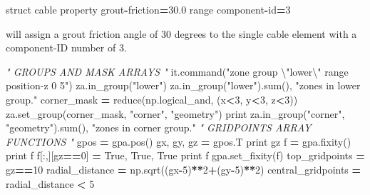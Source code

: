 \documentclass[a4paper, nobind]{templates/ociamthesis}
\newenvironment{Shaded}{\begin{snugshade}}{\end{snugshade}}
\newcommand{\BuiltInTok}[1]{#1}
\newcommand{\CharTok}[1]{\textcolor[rgb]{0.31,0.60,0.02}{#1}}
\newcommand{\CommentTok}[1]{\textcolor[rgb]{0.56,0.35,0.01}{\textit{#1}}}
\newcommand{\DecValTok}[1]{\textcolor[rgb]{0.00,0.00,0.81}{#1}}
\newcommand{\FloatTok}[1]{\textcolor[rgb]{0.00,0.00,0.81}{#1}}
\newcommand{\NormalTok}[1]{#1}
\newcommand{\OperatorTok}[1]{\textcolor[rgb]{0.81,0.36,0.00}{\textbf{#1}}}
\newcommand{\StringTok}[1]{\textcolor[rgb]{0.31,0.60,0.02}{#1}}
\newcommand{\VariableTok}[1]{\textcolor[rgb]{0.00,0.00,0.00}{#1}}
\renewenvironment{Shaded}
{
  \vspace{10pt}%
  \begin{snugshade}%
}{%
  \end{snugshade}%
  \vspace{8pt}%
}
\begin{document}
\begin{Shaded}
\begin{Highlighting}[]
\NormalTok{struct cable }\BuiltInTok{property}\NormalTok{ grout}\OperatorTok{{-}}\NormalTok{friction}\OperatorTok{=}\FloatTok{30.0} \BuiltInTok{range}\NormalTok{ component}\OperatorTok{{-}}\BuiltInTok{id}\OperatorTok{=}\DecValTok{3}
\end{Highlighting}
\end{Shaded}

will assign a grout friction angle of 30 degrees to the single cable
element with a component-ID number of 3.

\begin{Shaded}
\begin{Highlighting}[]
\CommentTok{" GROUPS AND MASK ARRAYS "}
\NormalTok{it.command(}\StringTok{"zone group }\CharTok{\textbackslash{}"}\StringTok{lower}\CharTok{\textbackslash{}"}\StringTok{ range position{-}z 0 5"}\NormalTok{)}
\NormalTok{za.in\_group(}\StringTok{"lower"}\NormalTok{)}
\NormalTok{za.in\_group(}\StringTok{"lower"}\NormalTok{).}\BuiltInTok{sum}\NormalTok{(), }\StringTok{"zones in lower group."}
\NormalTok{corner\_mask }\OperatorTok{=} \BuiltInTok{reduce}\NormalTok{(np.logical\_and, (x}\OperatorTok{\textless{}}\DecValTok{3}\NormalTok{, y}\OperatorTok{\textless{}}\DecValTok{3}\NormalTok{, z}\OperatorTok{\textless{}}\DecValTok{3}\NormalTok{))}
\NormalTok{za.set\_group(corner\_mask, }\StringTok{"corner"}\NormalTok{, }\StringTok{"geometry"}\NormalTok{)}
\BuiltInTok{print}\NormalTok{ za.in\_group(}\StringTok{"corner"}\NormalTok{, }\StringTok{"geometry"}\NormalTok{).}\BuiltInTok{sum}\NormalTok{(), }\StringTok{"zones in corner group."}
\CommentTok{" GRIDPOINTS ARRAY FUNCTIONS "}
\NormalTok{gpos }\OperatorTok{=}\NormalTok{ gpa.pos()}
\NormalTok{gx, gy, gz }\OperatorTok{=}\NormalTok{ gpos.T}
\BuiltInTok{print}\NormalTok{ gz}
\NormalTok{f }\OperatorTok{=}\NormalTok{ gpa.fixity()}
\BuiltInTok{print}\NormalTok{ f}
\NormalTok{f[:,][gz}\OperatorTok{==}\DecValTok{0}\NormalTok{] }\OperatorTok{=} \VariableTok{True}\NormalTok{, }\VariableTok{True}\NormalTok{, }\VariableTok{True}
\BuiltInTok{print}\NormalTok{ f}
\NormalTok{gpa.set\_fixity(f)}
\NormalTok{top\_gridpoints }\OperatorTok{=}\NormalTok{ gz}\OperatorTok{==}\DecValTok{10}
\NormalTok{radial\_distance }\OperatorTok{=}\NormalTok{ np.sqrt((gx}\OperatorTok{{-}}\DecValTok{5}\NormalTok{)}\OperatorTok{**}\DecValTok{2}\OperatorTok{+}\NormalTok{(gy}\OperatorTok{{-}}\DecValTok{5}\NormalTok{)}\OperatorTok{**}\DecValTok{2}\NormalTok{)}
\NormalTok{central\_gridpoints }\OperatorTok{=}\NormalTok{ radial\_distance }\OperatorTok{\textless{}} \DecValTok{5}

\end{Highlighting}
\end{Shaded}
\end{document}
